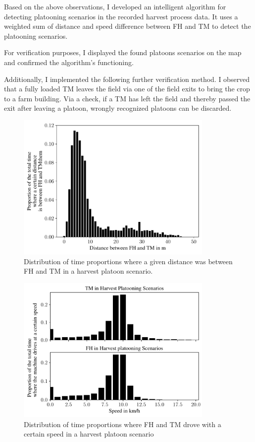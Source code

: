 Based on the above observations, I developed an intelligent algorithm for detecting platooning scenarios in the recorded harvest process data. It uses a weighted sum of distance and speed difference between \ac{FH} and \ac{TM} to detect the platooning scenarios.

For verification purposes, I displayed the found platoons scenarios on the map and confirmed the algorithm's functioning. 

Additionally, I implemented the following further verification method. 
I observed that a fully loaded \ac{TM} leaves the field via one of the field exits to bring the crop to a farm building. Via a check, if a \ac{TM} has left the field and thereby passed the exit after leaving a platoon, wrongly recognized platoons can be discarded.

\begin{figure}%
	\centering
	\includegraphics[width=0.85\textwidth]{figures/distanceHarvestScenario.pdf}
	\caption{Distribution of time proportions where a given distance was between \acf{FH} and \acf{TM} in a harvest platoon scenario.}%
	\label{fig:distance}%
\end{figure}
\begin{figure}%
	\centering
	\includegraphics[width=0.85\textwidth]{figures/speedHarvestScenario.pdf}
	\caption{Distribution of time proportions where \acf{FH} and \acf{TM} drove with a certain speed in a harvest platoon scenario}%
	\label{fig:speed}%
\end{figure}

